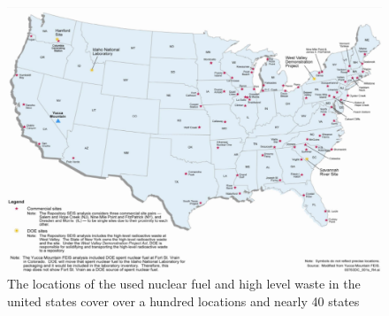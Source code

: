 
\begin{figure}[htb!]
  \begin{center}
    \includegraphics[width=0.7\linewidth]{locations.eps}
  \end{center}
  \caption{The locations of the used nuclear fuel and high level waste in the 
  united states cover over a hundred locations and nearly 40 states 
  \cite{doe_final_2008}}
  \label{fig:locations}
\end{figure}
